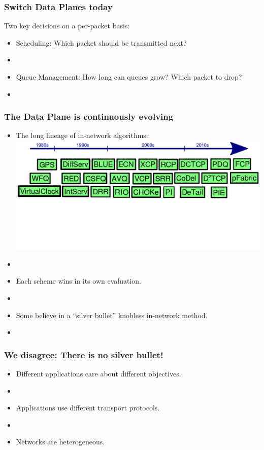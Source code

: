 \begin{frame}[plain]
\frametitle{Switch Data Planes today}
Two key decisions on a per-packet basis:
\begin{itemize}
\item Scheduling: Which packet should be transmitted next?
\item[]
\item Queue Management: How long can queues grow? Which packet to drop?
\item[]
\end{itemize}
\end{frame}

\begin{frame}[plain]
\frametitle{The Data Plane is continuously evolving}
\begin{itemize}
\item The long lineage of in-network algorithms:
\noindent \hspace{-.75 cm} \includegraphics[width=.9\textwidth]{march.png}
\vspace{-2cm}
\item[]
\item Each scheme wins in its own evaluation.
\item[]
\item Some believe in a ``silver bullet'' knobless in-network method.
\item[]

\end{itemize}
\end{frame}

\begin{frame}[plain]
\frametitle{We disagree: There is no silver bullet!}
\begin{itemize}
\item{Different applications care about different objectives.}
\item[]

\item{Applications use different transport protocols.}
\item[]

\item{Networks are heterogeneous.}

\end{itemize}
\end{frame}

